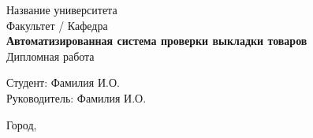 \begin{titlepage}
    \centering
    {\large Название университета} \\[0.5cm]
    {\large Факультет / Кафедра} \\[2cm]
    {\LARGE\bfseries Автоматизированная система проверки выкладки товаров} \\[0.5cm]
    {\large Дипломная работа} \\[3cm]
    \begin{flushright}
        Студент: Фамилия И.О. \\
        Руководитель: Фамилия И.О.
    \end{flushright}
    \vfill
    {\large Город, \the\year}
\end{titlepage}
